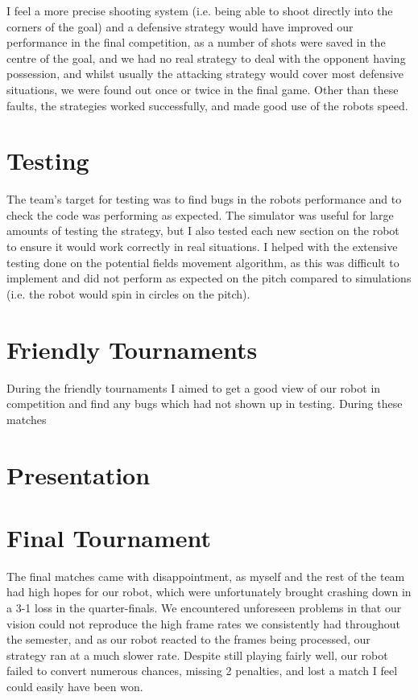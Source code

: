 \documentclass[12pt]{IEEEtran}
\begin{document}
I feel a more precise shooting system (i.e. being able to shoot directly into the corners of the goal) and a defensive strategy would have improved our performance in the final competition, as a number of shots were saved in the centre of the goal, and we had no real strategy to deal with the opponent having possession, and whilst usually the attacking strategy would cover most defensive situations, we were found out once or twice in the final game. Other than these faults, the strategies worked successfully, and made good use of the robots speed.


\section{Testing}
The team's target for testing was to find bugs in the robots performance and to check the code was performing as expected. The simulator was useful for large amounts of testing the strategy, but I also tested each new section on the robot to ensure it would work correctly in real situations. I helped with the extensive testing done on the potential fields movement algorithm, as this was difficult to implement and did not perform as expected on the pitch compared to simulations (i.e. the robot would spin in circles on the pitch). 

\section{Friendly Tournaments}
During the friendly tournaments I aimed to get a good view of our robot in competition and find any bugs which had not shown up in testing. During these matches 

\section{Presentation}



\section{Final Tournament}
The final matches came with disappointment, as myself and the rest of the team had high hopes for our robot, which were unfortunately brought crashing down in a 3-1 loss in the quarter-finals. We encountered unforeseen problems in that our vision could not reproduce the high frame rates we consistently had throughout the semester, and as our robot reacted to the frames being processed, our strategy ran at a much slower rate. Despite still playing fairly well, our robot failed to convert numerous chances, missing 2 penalties, and lost a match I feel could easily have been won. 
\end{document}
